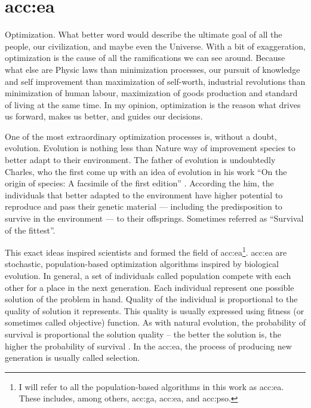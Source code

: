 \chapter{\texorpdfstring{\acrlong*{acc:ea}}{Evolution algorithms}}

Optimization. What better word would describe the ultimate goal of all the people, our civilization, and maybe even the Universe. With a bit of exaggeration, optimization is the cause of all the ramifications we can see around. Because what else are Physic laws than minimization processes, our pursuit of knowledge and self improvement than maximization of self-worth, industrial revolutions than minimization of human labour, maximization of goods production and standard of living at the same time. In my opinion, optimization is the reason what drives us forward, makes us better, and guides our decisions.

One of the most extraordinary optimization processes is, without a doubt, evolution. Evolution is nothing less than Nature way of improvement species to better adapt to their environment. The father of evolution is undoubtedly Charles, who the first come up with an idea of evolution in his work \enquote{On the origin of species: A facsimile of the first edition} \citep{darwin1964origin}. According the him, the individuals that better adapted to the environment have higher potential to reproduce and pass their genetic material --- including the predisposition to survive in the environment --- to their offsprings. Sometimes referred as \enquote{Survival of the fittest}.

This exact ideas inspired scientists and formed the field of \acrfull{acc:ea}\footnote{I will refer to all the population-based algorithms in this work as \acrlong*{acc:ea}. These includes, among others, \acrlong*{acc:ga}, \acrlong*{acc:ea}, and \acrlong*{acc:pso}.}.
\acrshort{acc:ea} are stochastic, population-based optimization algorithms inspired by biological evolution. In general, a set of individuals called population compete with each other for a place in the next generation. Each individual represent one possible solution of the problem in hand. Quality of the individual is proportional to the quality of solution it represents. This quality is usually expressed using fitness (or sometimes called objective) function. As with natural evolution, the probability of survival is proportional the solution quality -- the better the solution is, the higher the probability of survival \citep{IntroductionToEA}. In the \acrshort{acc:ea}, the process of producing new generation is usually called selection.

